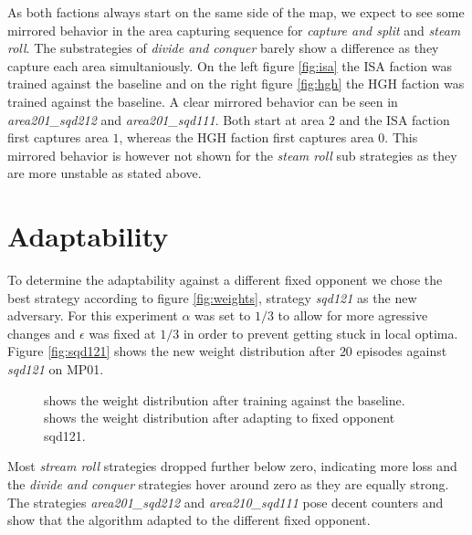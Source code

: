 As both factions always start on the same side of the map, we expect to see
some mirrored behavior in the area capturing sequence for \emph{capture and
split} and \emph{steam roll}. The substrategies of \emph{divide and conquer}
barely show a difference as they capture each area simultaniously. On the left
figure \ref{fig:isa} the ISA faction was trained against the baseline and on
the right figure \ref{fig:hgh} the HGH faction was trained against the
baseline. A clear mirrored behavior can be seen in \emph{area201\_sqd212} and
\emph{area201\_sqd111}. Both start at area $2$ and the ISA faction first
captures area $1$, whereas the HGH faction first captures area $0$. This
mirrored behavior is however not shown for the \emph{steam roll} sub strategies
as they are more unstable as stated above.


\section{Adaptability}
To determine the adaptability against a different fixed opponent we chose the
best strategy according to figure \ref{fig:weights}, strategy \emph{sqd121} as
the new adversary. For this experiment $\alpha$ was set to $1/3$ to allow for
more agressive changes and $\epsilon$ was fixed at $1/3$ in order to prevent
getting stuck in local optima. Figure \ref{fig:sqd121} shows the new weight
distribution after $20$ episodes against \emph{sqd121} on MP01.
\begin{figure}[ht]
\centering
{}
\label{fig:adaptability}
\caption[Adaptability]{ shows the weight distribution
after training against the baseline.  shows the weight
distribution after adapting to fixed opponent sqd121.}
\end{figure}
Most \emph{stream roll} strategies dropped further below zero, indicating more
loss and the \emph{divide and conquer} strategies hover around zero as they
are equally strong.  The strategies \emph{area201\_sqd212} and
\emph{area210\_sqd111} pose decent counters and show that the algorithm adapted
to the different fixed opponent.
